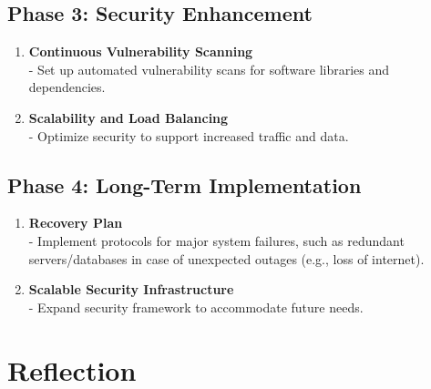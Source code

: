 \documentclass{article}
\begin{document}
\subsection*{Phase 3: Security Enhancement}
\begin{enumerate}
  \item \textbf{Continuous Vulnerability Scanning} \\
  \hspace*{1em} - Set up automated vulnerability scans for software libraries and dependencies.
  \item \textbf{Scalability and Load Balancing} \\
  \hspace*{1em} - Optimize security to support increased traffic and data.
\end{enumerate}

\subsection*{Phase 4: Long-Term Implementation}
\begin{enumerate}
  \item \textbf{Recovery Plan} \\
  \hspace*{1em} - Implement protocols for major system failures, such as redundant servers/databases in case of unexpected outages (e.g., loss of internet).
  \item \textbf{Scalable Security Infrastructure} \\
  \hspace*{1em} - Expand security framework to accommodate future needs.
\end{enumerate}

\section{Reflection}
\end{document}
